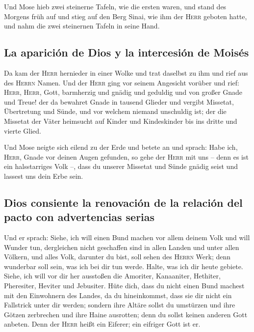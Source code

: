  Und Mose hieb zwei steinerne Tafeln, wie die ersten
waren, und stand des Morgens früh auf und stieg auf den Berg Sinai, wie
ihm der \textsc{Herr} geboten hatte, und nahm die zwei steinernen Tafeln
in seine Hand.

\hypertarget{la-apariciuxf3n-de-dios-y-la-intercesiuxf3n-de-moisuxe9s}{%
\subsection{La aparición de Dios y la intercesión de
Moisés}\label{la-apariciuxf3n-de-dios-y-la-intercesiuxf3n-de-moisuxe9s}}

 Da kam der \textsc{Herr} hernieder in einer Wolke und
trat daselbst zu ihm und rief aus des \textsc{Herrn} Namen.
 Und der \textsc{Herr} ging vor seinem Angesicht vorüber
und rief: \textsc{Herr}, \textsc{Herr}, Gott, barmherzig und gnädig und
geduldig und von großer Gnade und Treue!  der da bewahret
Gnade in tausend Glieder und vergibt Missetat, Übertretung und Sünde,
und vor welchem niemand unschuldig ist; der die Missetat der Väter
heimsucht auf Kinder und Kindeskinder bis ins dritte und vierte Glied.

 Und Mose neigte sich eilend zu der Erde und betete an
 und sprach: Habe ich, \textsc{Herr}, Gnade vor deinen
Augen gefunden, so gehe der \textsc{Herr} mit uns -- denn es ist ein
halsstarriges Volk --, dass du unserer Missetat und Sünde gnädig seist
und lassest uns dein Erbe sein.

\hypertarget{dios-consiente-la-renovaciuxf3n-de-la-relaciuxf3n-del-pacto-con-advertencias-serias}{%
\subsection{Dios consiente la renovación de la relación del pacto con
advertencias
serias}\label{dios-consiente-la-renovaciuxf3n-de-la-relaciuxf3n-del-pacto-con-advertencias-serias}}

 Und er sprach: Siehe, ich will einen Bund machen vor
allem deinem Volk und will Wunder tun, dergleichen nicht geschaffen sind
in allen Landen und unter allen Völkern, und alles Volk, darunter du
bist, soll sehen des \textsc{Herrn} Werk; denn wunderbar soll sein, was
ich bei dir tun werde.  Halte, was ich dir heute gebiete.
Siehe, ich will vor dir her ausstoßen die Amoriter, Kanaaniter,
Hethiter, Pheresiter, Heviter und Jebusiter.  Hüte dich,
dass du nicht einen Bund machest mit den Einwohnern des Landes, da du
hineinkommst, dass sie dir nicht ein Fallstrick unter dir werden;
 sondern ihre Altäre sollst du umstürzen und ihre Götzen
zerbrechen und ihre Haine ausrotten;  denn du sollst
keinen anderen Gott anbeten. Denn der \textsc{Herr} heißt ein Eiferer;
ein eifriger Gott ist er.

